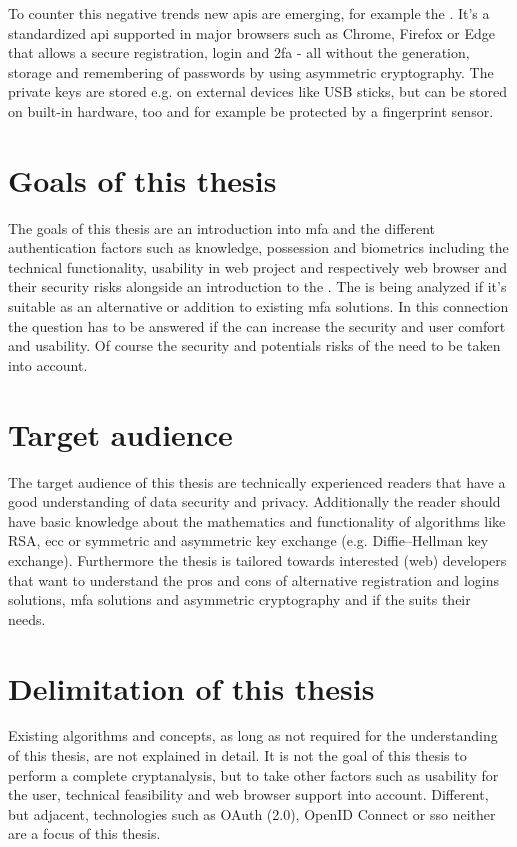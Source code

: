 To counter this negative trends new \glspl{api} are emerging, for example the \wa. It's a standardized \gls{api} supported in major browsers such as Chrome, Firefox or Edge that allows  a secure registration, login and \gls{2fa} - all without the generation, storage and remembering of passwords by using asymmetric cryptography. The private keys are stored e.g. on external devices like USB sticks, but can be stored on built-in hardware, too and for example be protected by a fingerprint sensor.

\section{Goals of this thesis}

The goals of this thesis are an introduction into \gls{mfa} and the different authentication factors such as \frqq knowledge, possession and biometrics\flqq{} including the technical functionality, usability in web project and respectively web browser and their security risks alongside an introduction to the \wa. The \wa{} is being analyzed if it's suitable as an alternative or addition to existing \gls{mfa} solutions. In this connection the question has to be answered if the \wa{} can increase the security and user comfort and usability. Of course the security and potentials risks of the \wa{} need to be taken into account.

\section{Target audience}

The target audience of this thesis are technically experienced readers that have a good understanding of data security and privacy. Additionally the reader should have basic knowledge about the mathematics and functionality of algorithms like RSA, \gls{ecc} or symmetric and asymmetric key exchange (e.g. Diffie–Hellman key exchange). Furthermore the thesis is tailored towards interested (web) developers that want to understand the pros and cons of alternative registration and logins solutions, \gls{mfa} solutions and asymmetric cryptography and if the \wa{} suits their needs.

\section{Delimitation of this thesis}

Existing algorithms and concepts, as long as not required for the understanding of this thesis, are not explained in detail. It is not the goal of this thesis to perform a complete cryptanalysis, but to take other factors such as usability for the user, technical feasibility and web browser support into account. Different, but adjacent, technologies such as OAuth (2.0), OpenID Connect or \gls{sso} neither are a focus of this thesis.

